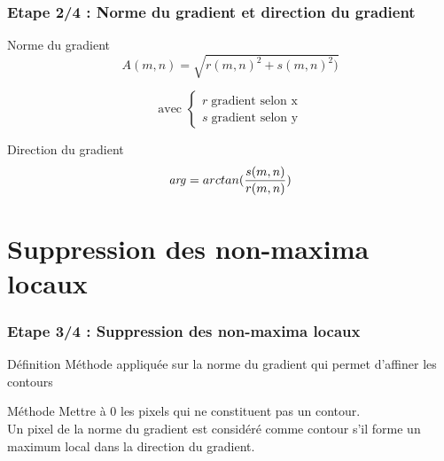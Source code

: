 \documentclass{beamer}
\begin{document}
\begin{frame}
\frametitle{Etape 2/4 : Norme du gradient et direction du gradient}

\begin{block}{Norme du gradient}
\[ A(m,n)=\sqrt{r(m,n)^2 + s(m,n)^2)} \]

\[ \text{avec }\left\{\begin{array}{ll}
r \; \text{gradient selon x} \\
s \; \text{gradient selon y}
\end{array}\right. \]
\end{block}

\begin{block}{Direction du gradient}
\[ \text{\emph{arg}} = arctan(\frac{s(m,n)}{r(m,n)}) \]
\end{block}

\end{frame}

\section{Suppression des non-maxima locaux}

\begin{frame}
\frametitle{Etape 3/4 : Suppression des non-maxima locaux}

\begin{block}{Définition}
Méthode appliquée sur la norme du gradient qui permet d'affiner les contours
\end{block}

\begin{block}{Méthode}
Mettre à 0 les pixels qui ne constituent pas un contour. \\
Un pixel de la norme du gradient est considéré comme contour s'il forme un maximum local dans la direction du gradient.
\end{block}

\end{frame}
\end{document}

